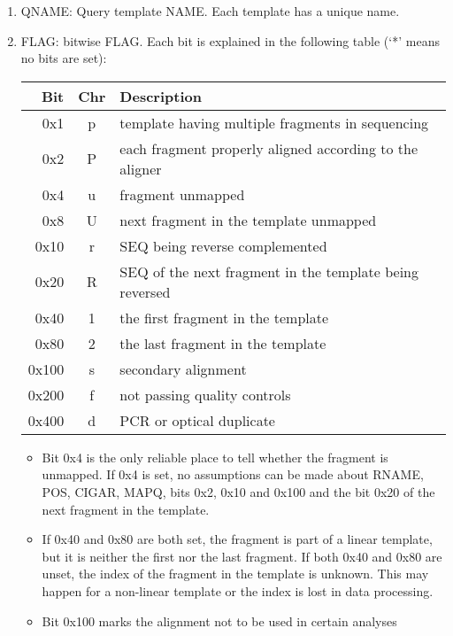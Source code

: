 \documentclass[10pt]{article}
\begin{document}
\begin{enumerate}
\item {\sf QNAME}: Query template NAME. Each template has a unique name.
\item {\sf FLAG}: bitwise FLAG. Each bit is explained in the following
  table (`*' means no bits are set):
  \begin{center}\small
  \begin{tabular}{rcl}
  \hline
  Bit & Chr\footnotemark[1] & Description\\
  \hline
  0x1 &  p&template having multiple fragments in sequencing \\
  0x2 &  P&each fragment properly aligned according to the aligner \\
  0x4 &  u&fragment unmapped \\
  0x8 &  U&next fragment in the template unmapped \\
  0x10 & r& {\sf SEQ} being reverse complemented \\
  0x20 & R& {\sf SEQ} of the next fragment in the template being reversed \\
  0x40 & 1& the first fragment in the template \\
  0x80 & 2& the last fragment in the template \\
  0x100 &s&  secondary alignment\\
  0x200 &f&  not passing quality controls \\
  0x400 &d&  PCR or optical duplicate \\
  \hline
  \end{tabular}
  \end{center}
  \begin{itemize}
  \item Bit 0x4 is the only reliable place to tell whether the fragment
    is unmapped. If 0x4 is set, no assumptions can be made about {\sf
      RNAME}, {\sf POS}, {\sf CIGAR}, {\sf MAPQ}, bits 0x2, 0x10 and
    0x100 and the bit 0x20 of the next fragment in the template.
  \item If 0x40 and 0x80 are both set, the fragment is part of a linear
    template, but it is neither the first nor the last fragment. If both
    0x40 and 0x80 are unset, the index of the fragment in the template
    is unknown. This may happen for a non-linear template or the index
    is lost in data processing.
  \item Bit 0x100 marks the alignment not to be used in certain analyses

\end{itemize}
\end{enumerate}
\end{document}
